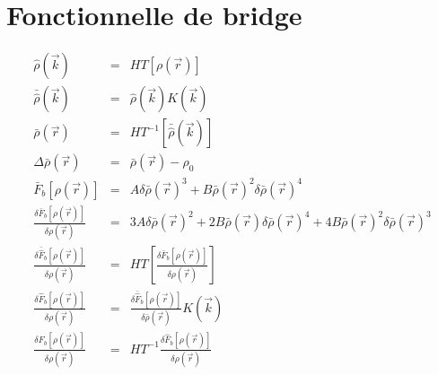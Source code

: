 \section{Fonctionnelle de bridge}
\label{sec:annexes:grad:bridge}
\begin{eqnarray}
\hat{\rho}(\vec{k})&=&HT[\rho(\vec{r})]  \\
\bar{\hat{\rho}}(\vec{k})&=&\hat{\rho}(\vec{k})K(\vec{k})   \\
\bar{\rho}(\vec{r})&=&HT^{-1}[\bar{\hat{\rho}}(\vec{k})]  \\
\Delta\bar{\rho}(\vec{r})&=&\bar{\rho}(\vec{r})-\rho_{0}  \\
\bar{F}_{b}[\rho(\vec{r})]&=&A\delta\bar{\rho}(\vec{r})^{3}+B\bar{\rho}(\vec{r})^{2}\delta\bar{\rho}(\vec{r})^{4}  \\
\frac{\delta\bar{F}_{b}[\rho(\vec{r})]}{\delta\rho(\vec{r})}&=&3A\delta\bar{\rho}(\vec{r})^{2}+2B\bar{\rho}(\vec{r})\delta\bar{\rho}(\vec{r})^{4}+4B\bar{\rho}(\vec{r})^{2}\delta\bar{\rho}(\vec{r})^{3}  \\
\frac{\delta\bar{\hat{F}}_{b}[\rho(\vec{r})]}{\delta\rho(\vec{r})}&=&HT[\frac{\delta\bar{F}_{b}[\rho(\vec{r})]}{\delta\rho(\vec{r})}]  \\
\frac{\delta\hat{F}_{b}[\rho(\vec{r})]}{\delta\rho(\vec{r})}&=&\frac{\delta\bar{\hat{F}}_{b}[\rho(\vec{r})]}{\delta\bar{\rho}(\vec{r})}K(\vec{k})  \\
\frac{\delta F_{b}[\rho(\vec{r})]}{\delta\rho(\vec{r})}&=&HT^{-1}\frac{\delta\hat{F}_{b}[\rho(\vec{r})]}{\delta\rho(\vec{r})} 
\end{eqnarray}




%

%

